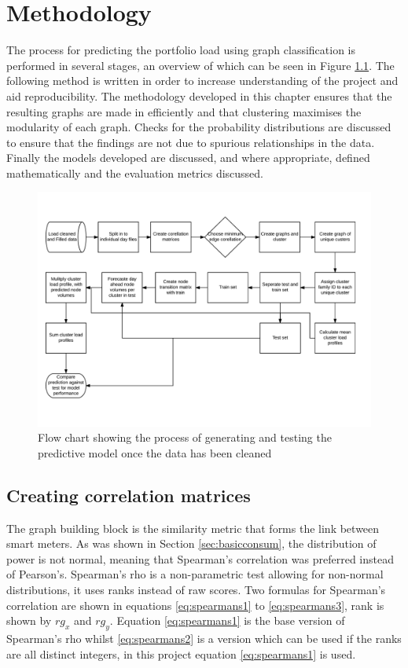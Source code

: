 \chapter{Methodology}
\label{Method}

The process for predicting the portfolio load using graph classification is performed in several stages, an overview of which can be seen in Figure \ref{fig:ProcessFlow}. The following method is written in order to increase understanding of the project and aid reproducibility. The methodology developed in this chapter ensures that the resulting graphs are made in efficiently and that clustering maximises the modularity of each graph. Checks for the probability distributions are discussed to ensure that the findings are not due to spurious relationships in the data. Finally the models developed are discussed, and where appropriate, defined mathematically and the evaluation metrics discussed.

\begin{figure}[ht]
    \centering
    \includegraphics[width =\textwidth]{Figures/Appendix/Thesisprocess.png}
    \caption[Project process]{Flow chart showing the process of generating and testing the predictive model once the data has been cleaned}
    \label{fig:ProcessFlow}
\end{figure}


\section{Creating correlation matrices}
\label{sec:cormat} \label{sec:CormatEdge}
The graph building block is the similarity metric that forms the link between smart meters. As was shown in Section \ref{sec:basicconsum}, the distribution of power is not normal, meaning that Spearman's correlation \cite{spearmansrankcorrelationcoefficient2016} was preferred instead of Pearson's. Spearman's rho is a non-parametric test allowing for non-normal distributions, it uses ranks instead of raw scores. Two formulas for Spearman's correlation are shown in equations \ref{eq:spearmans1} to \ref{eq:spearmans3}, rank is shown by $rg_x$ and $rg_y$. Equation \ref{eq:spearmans1} is the base version of Spearman's rho whilst \ref{eq:spearmans2} is a version which can be used if the ranks are all distinct integers, in this project equation \ref{eq:spearmans1} is used.

